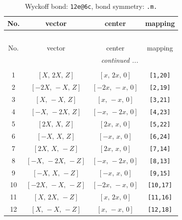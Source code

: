 \documentclass[fleqn,8pt]{jsarticle}
\begin{document}
\begin{longtable}{cccc}
\caption{Wyckoff bond: {\tt 12e@6c}, bond symmetry: {\tt .m.}}
 \\
 \hline \hline
No. & vector & center & mapping \\ \hline \endfirsthead

\multicolumn{3}{l}{\tablename\ \thetable{}} \\
 \hline \hline
No. & vector & center & mapping \\ \hline \endhead

 \hline \hline
\multicolumn{3}{r}{\footnotesize\it continued ...} \\ \endfoot

 \hline \hline
\multicolumn{3}{r}{} \\ \endlastfoot

1 & $\left[ X,\, 2 X,\, Z \right]$ & $\left[ x,\, 2 x,\, 0 \right]$ & {\tt [1,20]} \\ \hline
2 & $\left[ - 2 X,\, - X,\, Z \right]$ & $\left[ - 2 x,\, - x,\, 0 \right]$ & {\tt [2,19]} \\ \hline
3 & $\left[ X,\, - X,\, Z \right]$ & $\left[ x,\, - x,\, 0 \right]$ & {\tt [3,21]} \\ \hline
4 & $\left[ - X,\, - 2 X,\, Z \right]$ & $\left[ - x,\, - 2 x,\, 0 \right]$ & {\tt [4,23]} \\ \hline
5 & $\left[ 2 X,\, X,\, Z \right]$ & $\left[ 2 x,\, x,\, 0 \right]$ & {\tt [5,22]} \\ \hline
6 & $\left[ - X,\, X,\, Z \right]$ & $\left[ - x,\, x,\, 0 \right]$ & {\tt [6,24]} \\ \hline
7 & $\left[ 2 X,\, X,\, - Z \right]$ & $\left[ 2 x,\, x,\, 0 \right]$ & {\tt [7,14]} \\ \hline
8 & $\left[ - X,\, - 2 X,\, - Z \right]$ & $\left[ - x,\, - 2 x,\, 0 \right]$ & {\tt [8,13]} \\ \hline
9 & $\left[ - X,\, X,\, - Z \right]$ & $\left[ - x,\, x,\, 0 \right]$ & {\tt [9,15]} \\ \hline
10 & $\left[ - 2 X,\, - X,\, - Z \right]$ & $\left[ - 2 x,\, - x,\, 0 \right]$ & {\tt [10,17]} \\ \hline
11 & $\left[ X,\, 2 X,\, - Z \right]$ & $\left[ x,\, 2 x,\, 0 \right]$ & {\tt [11,16]} \\ \hline
12 & $\left[ X,\, - X,\, - Z \right]$ & $\left[ x,\, - x,\, 0 \right]$ & {\tt [12,18]} \\
\end{longtable}
\renewcommand{\arraystretch}{1.2}
\end{document}

